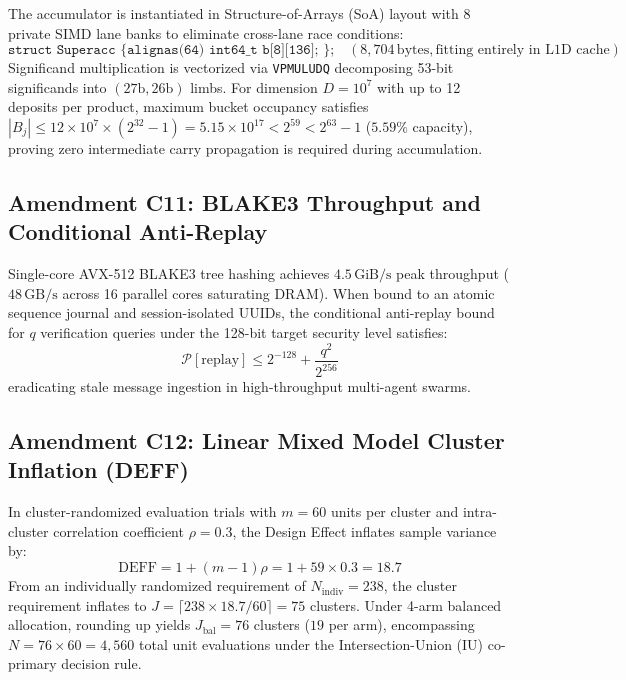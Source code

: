 \documentclass[11pt,a4paper]{article}
\begin{document}
The accumulator is instantiated in Structure-of-Arrays (SoA) layout with 8 private SIMD lane banks to eliminate cross-lane race conditions:
\begin{equation}
\label{eq:superacc_soa}
\texttt{struct Superacc \{ alignas(64) int64\_t b[8][136]; \};} \quad (8,704\,\text{bytes}, \text{fitting entirely in L1D cache})
\end{equation}
Significand multiplication is vectorized via \texttt{VPMULUDQ} decomposing 53-bit significands into $(27\text{b}, 26\text{b})$ limbs. For dimension $D = 10^7$ with up to 12 deposits per product, maximum bucket occupancy satisfies $|B_j| \le 12 \times 10^7 \times (2^{32}-1) = 5.15 \times 10^{17} < 2^{59} < 2^{63}-1$ ($5.59\%$ capacity), proving zero intermediate carry propagation is required during accumulation.

\subsection{Amendment C11: BLAKE3 Throughput and Conditional Anti-Replay}
\label{subsec:c11}
Single-core AVX-512 BLAKE3 tree hashing achieves $4.5\,\text{GiB/s}$ peak throughput ($48\,\text{GB/s}$ across 16 parallel cores saturating DRAM). When bound to an atomic sequence journal and session-isolated UUIDs, the conditional anti-replay bound for $q$ verification queries under the 128-bit target security level satisfies:
\begin{equation}
\label{eq:antireplay}
\mathcal{P}[\text{replay}] \le 2^{-128} + \frac{q^2}{2^{256}}
\end{equation}
eradicating stale message ingestion in high-throughput multi-agent swarms.

\subsection{Amendment C12: Linear Mixed Model Cluster Inflation (DEFF)}
\label{subsec:c12}
In cluster-randomized evaluation trials with $m = 60$ units per cluster and intra-cluster correlation coefficient $\rho = 0.3$, the Design Effect inflates sample variance by:
\begin{equation}
\label{eq:deff}
\mathrm{DEFF} = 1 + (m - 1)\rho = 1 + 59 \times 0.3 = 18.7
\end{equation}
From an individually randomized requirement of $N_{\text{indiv}} = 238$, the cluster requirement inflates to $J = \lceil 238 \times 18.7 / 60 \rceil = 75$ clusters. Under 4-arm balanced allocation, rounding up yields $J_{\text{bal}} = 76$ clusters ($19$ per arm), encompassing $N = 76 \times 60 = 4,560$ total unit evaluations under the Intersection-Union (IU) co-primary decision rule.
\end{document}
